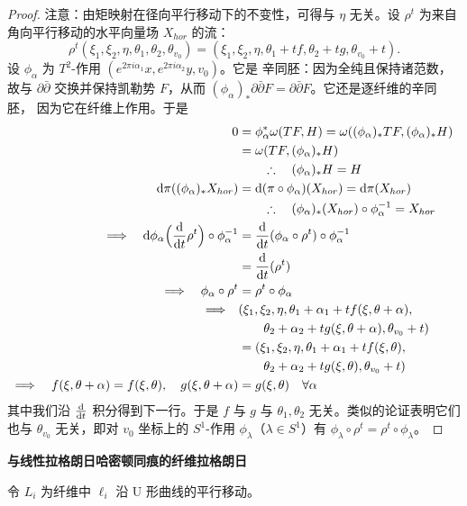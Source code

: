 \begin{proof}
注意：由矩映射在径向平行移动下的不变性，可得与 $\eta$ 无关。设 $\rho^t$ 为来自
角向平行移动的水平向量场 $X_{hor}$ 的流：
\[
\rho^t(\xi_1,\xi_2,\eta,\theta_1,\theta_2,\theta_{v_0})
=(\xi_1,\xi_2,\eta,\theta_1+tf,\theta_2+tg,\theta_{v_0}+t).
\]
设 $\phi_\alpha$ 为 $T^2$-作用 $(e^{2\pi i\alpha_1}x,e^{2\pi i\alpha_2}y,v_0)$。它是
辛同胚：因为全纯且保持诸范数，故与 $\partial\bar\partial$ 交换并保持凯勒势 $F$，从而
$(\phi_\alpha)_*\partial\bar\partial F=\partial\bar\partial F$。它还是逐纤维的辛同胚，
因为它在纤维上作用。于是
\begin{align*}
0&=\phi_\alpha^*\omega(TF,H)=\omega((\phi_\alpha)_*TF,(\phi_\alpha)_*H)\\
&=\omega(TF,(\phi_\alpha)_*H)\\
&\qquad\therefore\quad (\phi_\alpha)_*H=H\\
\mathrm{d}\pi((\phi_\alpha)_*X_{hor})&=\mathrm{d}(\pi\circ\phi_\alpha)(X_{hor})=\mathrm{d}\pi(X_{hor})\\
&\qquad\therefore\quad (\phi_\alpha)_*(X_{hor})\circ\phi_\alpha^{-1}=X_{hor}\\
\Longrightarrow\quad \mathrm{d}\phi_\alpha\Big(\frac{\mathrm{d}}{\mathrm{d} t}\rho^t\Big)\circ\phi_\alpha^{-1}
&=\frac{\mathrm{d}}{\mathrm{d} t}(\phi_\alpha\circ\rho^t)\circ\phi_\alpha^{-1}\\
&=\frac{\mathrm{d}}{\mathrm{d} t}(\rho^t)\\
\Longrightarrow\quad \phi_\alpha\circ\rho^t&=\rho^t\circ\phi_\alpha\\
\Longrightarrow\quad
&(\xi_1,\xi_2,\eta,\theta_1+\alpha_1+tf(\xi,\theta+\alpha),\\
&\qquad \theta_2+\alpha_2+tg(\xi,\theta+\alpha),\theta_{v_0}+t)\\
&=
(\xi_1,\xi_2,\eta,\theta_1+\alpha_1+tf(\xi,\theta),\\
&\qquad \theta_2+\alpha_2+tg(\xi,\theta),\theta_{v_0}+t)\\
\Longrightarrow\quad f(\xi,\theta+\alpha)=f(\xi,\theta),\quad
g(\xi,\theta+\alpha)&=g(\xi,\theta)\quad\forall\alpha
\end{align*}
其中我们沿 $\frac{\mathrm{d}}{\mathrm{d} t}$ 积分得到下一行。于是 $f$ 与 $g$ 与 $\theta_1,\theta_2$
无关。类似的论证表明它们也与 $\theta_{v_0}$ 无关，即对 $v_0$ 坐标上的 $S^1$-作用
$\phi_\lambda$（$\lambda\in S^1$）有 $\phi_\lambda\circ\rho^t=\rho^t\circ\phi_\lambda$。
\end{proof}

\medskip\noindent\textbf{与线性拉格朗日哈密顿同痕的纤维拉格朗日}\par
\begin{definition}\label{def:4-1-27}
令 $L_i$ 为纤维中 $\ell_i$ 沿 U 形曲线的平行移动。
\end{definition}

